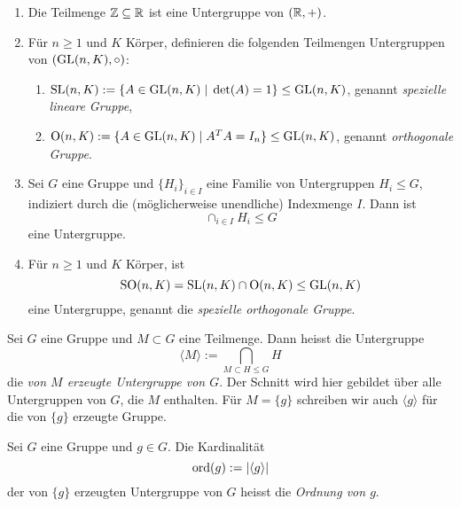 \documentclass{book}
\begin{document}
\begin{exas}
\label{exas:untergruppen}
    \begin{enumerate}
        \item Die Teilmenge $\mathbb{Z} \subseteq \mathbb{R}$ ist eine Untergruppe von $(\mathbb{R},+)$. 
        \item Für $n \ge 1$ und $K$ Körper, definieren die folgenden Teilmengen Untergruppen von $(\operatorname{GL}(n,K), \circ)$:
            \begin{enumerate}
                \item $\operatorname{SL}(n,K) := \{A \in \operatorname{GL}(n,K)\;  | \; \det(A) = 1 \} \leq \operatorname{GL}(n,K)$, genannt {\em spezielle lineare Gruppe},
                \item $\operatorname{O}(n,K) := \{A \in \operatorname{GL}(n,K)\; | \; A^TA = I_n \} \leq \operatorname{GL}(n,K)$, genannt {\em orthogonale Gruppe}.
            \end{enumerate}
        \item Sei $G$ eine Gruppe und $\{H_i\}_{i \in I}$ eine Familie von Untergruppen $H_i
            \leq G$, indiziert durch die (möglicherweise unendliche) Indexmenge $I$. Dann ist
            \[
                \cap_{i \in I} H_i \leq G
            \]
            eine Untergruppe. 
        \item Für $n \ge 1$ und $K$ Körper, ist 
            \[
                \operatorname{SO}(n,K) = \operatorname{SL}(n,K) \cap \operatorname{O}(n,K) \leq \operatorname{GL}(n,K)
            \]
            eine Untergruppe, genannt die {\em spezielle orthogonale Gruppe}.
    \end{enumerate}
\end{exas}


\begin{defi}
\label{defi:erzeugte} 
Sei $G$ eine Gruppe und $M \subset G$ eine Teilmenge. Dann heisst die
Untergruppe
\[
    \langle M \rangle := \bigcap_{M \subset H \leq G} H
\]
die {\em von $M$ erzeugte Untergruppe von $G$}. Der Schnitt wird hier gebildet
über alle Untergruppen von $G$, die $M$ enthalten. Für $M = \{g\}$ schreiben
wir auch $\langle g \rangle$ für die von $\{g\}$ erzeugte Gruppe. 
\end{defi}

\begin{defi}
\label{defi:ordnung}
    Sei $G$ eine Gruppe und $g \in G$. Die Kardinalität
    \[
        \operatorname{ord}(g) := | \langle g \rangle |
    \]
    der von $\{g\}$ erzeugten Untergruppe von $G$ heisst die {\em Ordnung von $g$}. 
\end{defi}
\end{document}

